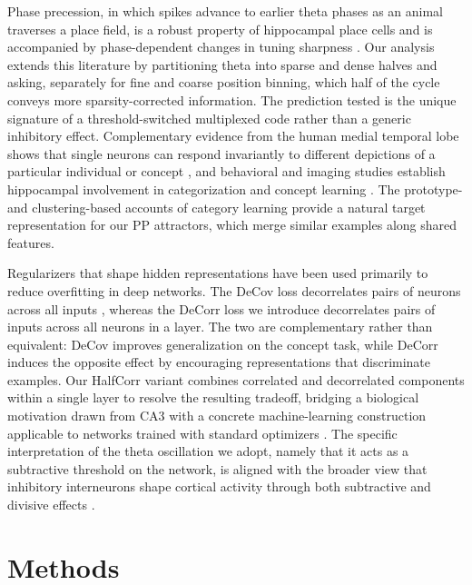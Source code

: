 \documentclass[11pt]{article}
\begin{document}
Phase precession, in which spikes advance to earlier theta phases as an
animal traverses a place field, is a robust property of hippocampal place
cells \cite{okeefe1993phase,tsodyks1996population} and is accompanied by
phase-dependent changes in tuning sharpness \cite{skaggs1996theta}. Our
analysis extends this literature by partitioning theta into sparse and
dense halves and asking, separately for fine and coarse position binning,
which half of the cycle conveys more sparsity-corrected information. The
prediction tested is the unique signature of a threshold-switched
multiplexed code rather than a generic inhibitory effect. Complementary
evidence from the human medial temporal lobe shows that single neurons can
respond invariantly to different depictions of a particular individual or
concept \cite{quiroga2005invariant}, and behavioral and imaging studies
establish hippocampal involvement in categorization and concept learning
\cite{knowlton1993learning,zeithamova2019brain}. The prototype- and
clustering-based accounts of category learning
\cite{anderson1991adaptive,love2004sustain} provide a natural target
representation for our PP attractors, which merge similar examples along
shared features.

Regularizers that shape hidden representations have been used primarily to
reduce overfitting in deep networks. The DeCov loss decorrelates pairs of
neurons across all inputs \cite{cogswell2016reducing}, whereas the DeCorr
loss we introduce decorrelates pairs of inputs across all neurons in a
layer. The two are complementary rather than equivalent: DeCov improves
generalization on the concept task, while DeCorr induces the opposite
effect by encouraging representations that discriminate examples. Our
HalfCorr variant combines correlated and decorrelated components within a
single layer to resolve the resulting tradeoff, bridging a biological
motivation drawn from CA3 \cite{hopfield1982neural,schapiro2017complementary}
with a concrete machine-learning construction applicable to networks
trained with standard optimizers \cite{kingma2015adam,lecun2015deep}. The
specific interpretation of the theta oscillation we adopt, namely that it
acts as a subtractive threshold on the network, is aligned with the broader
view that inhibitory interneurons shape cortical activity through both
subtractive and divisive effects \cite{isaacson2011inhibition}.

\section{Methods}
\end{document}
